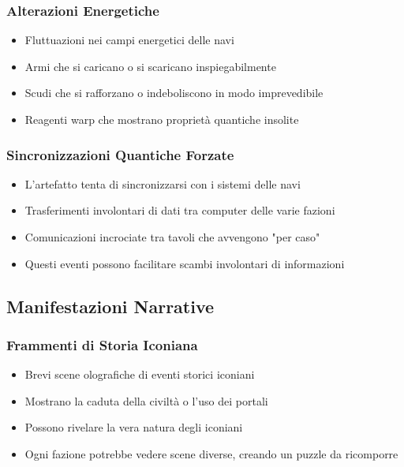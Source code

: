 \documentclass[letterpaper,twocolumn,openany,nodeprecatedcode]{dndbook}
\begin{document}
\subsubsection{Alterazioni Energetiche}
   \begin{itemize}
       \item Fluttuazioni nei campi energetici delle navi
       \item Armi che si caricano o si scaricano inspiegabilmente
       \item Scudi che si rafforzano o indeboliscono in modo imprevedibile
       \item Reagenti warp che mostrano proprietà quantiche insolite
   \end{itemize}

\subsubsection{Sincronizzazioni Quantiche Forzate}
   \begin{itemize}
       \item L'artefatto tenta di sincronizzarsi con i sistemi delle navi
       \item Trasferimenti involontari di dati tra computer delle varie fazioni
       \item Comunicazioni incrociate tra tavoli che avvengono "per caso"
       \item Questi eventi possono facilitare scambi involontari di informazioni
   \end{itemize}

\subsection{Manifestazioni Narrative}

\subsubsection{Frammenti di Storia Iconiana}
    \begin{itemize}
        \item Brevi scene olografiche di eventi storici iconiani
        \item Mostrano la caduta della civiltà o l'uso dei portali
        \item Possono rivelare la vera natura degli iconiani
        \item Ogni fazione potrebbe vedere scene diverse, creando un puzzle da ricomporre
    \end{itemize}
\end{document}
